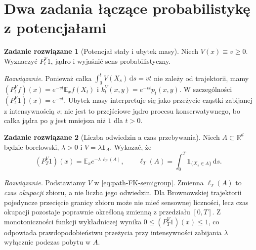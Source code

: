 \documentclass[11pt,a4paper,oneside]{report}
\numberwithin{equation}{chapter}
\theoremstyle{plain}
\theoremstyle{definition}
\newtheorem{zadanie}{Zadanie rozwiązane}[chapter]
\theoremstyle{remark}
\newcommand{\R}{\mathbb{R}}
\newcommand{\E}{\mathbb{E}}
\newcommand{\ind}[1]{\mathbf{1}_{#1}}
\newcommand{\dd}{\mathrm{d}}
\begin{document}
\begin{center}
\end{center}

\section{Dwa zadania łączące probabilistykę z potencjałami}\label{sec:volIII:15:08}

\begin{zadanie}[Potencjał stały i ubytek masy]
Niech $V(x)\equiv v\ge0$. Wyznaczyć $P_t^V1$,
jądro i wyjaśnić sens probabilistyczny.

\emph{Rozwiązanie.} Ponieważ całka $\int_0^t V(X_s)\,\dd s=vt$
nie zależy od trajektorii, mamy
$(P_t^Vf)(x)=e^{-vt}\E_xf(X_t)$ i
$k_t^V(x,y)=e^{-vt}p_t(x,y)$. W szczególności
$(P_t^V1)(x)=e^{-vt}$. Ubytek masy interpretuje się
jako przeżycie cząstki zabijanej z intensywnością $v$;
nie jest to przejściowe jądro procesu konserwatywnego,
bo całka jądra po $y$ jest mniejsza niż $1$ dla $t>0$.
\end{zadanie}

\begin{zadanie}[Liczba odwiedzin a czas przebywania]
Niech $A\subset\R^d$ będzie borelowski,
$\lambda>0$ i $V=\lambda\ind{A}$. Wykazać, że
\[
 (P_T^V1)(x)=\E_x e^{-\lambda\,\ell_T(A)},
 \qquad \ell_T(A)=\int_0^T\ind{\{X_s\in A\}}\,\dd s.
\]

\emph{Rozwiązanie.} Podstawiamy $V$ w
\eqref{eq:path-FK-semigroup}. Zmienna $\ell_T(A)$
to \emph{czas okupacji} zbioru, a nie liczba jego odwiedzin.
Dla Brownowskiej trajektorii pojedyncze przecięcie granicy
zbioru może nie mieć sensownej liczności, lecz czas
okupacji pozostaje poprawnie określoną zmienną z przedziału
$[0,T]$. Z monotoniczności funkcji wykładniczej wynika
$0\le (P_T^V1)(x)\le1$, co odpowiada prawdopodobieństwu
przeżycia przy intensywności zabijania $\lambda$ wyłącznie
podczas pobytu w $A$.
\end{zadanie}
\end{document}
